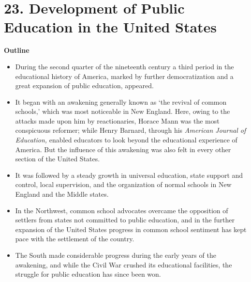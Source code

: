 \documentclass[
]{book}
\providecommand{\tightlist}{%
  \setlength{\itemsep}{0pt}\setlength{\parskip}{0pt}}
\begin{document}
\hypertarget{development-of-public-education-in-the-united-states}{%
\chapter{23. Development of Public Education in the United States}\label{development-of-public-education-in-the-united-states}}

\textbf{Outline}

\begin{itemize}
\tightlist
\item
  During the second quarter of the nineteenth century a third period in the educational history of America, marked by further democratization and a great expansion of public education, appeared.
\item
  It began with an awakening generally known as `the revival of common schools,' which was most noticeable in New England. Here, owing to the attacks made upon him by reactionaries, Horace Mann was the most conspicuous reformer; while Henry Barnard, through his \emph{American Journal of Education,} enabled educators to look beyond the educational experience of America. But the influence of this awakening was also felt in every other section of the United States.
\item
  It was followed by a steady growth in universal education, state support and control, local supervision, and the organization of normal schools in New England and the Middle states.
\item
  In the Northwest, common school advocates overcame the opposition of settlers from states not committed to public education, and in the further expansion of the United States progress in common school sentiment has kept pace with the settlement of the country.
\item
  The South made considerable progress during the early years of the awakening, and while the Civil War crushed its educational facilities, the struggle for public education has since been won.
\end{itemize}
\end{document}
